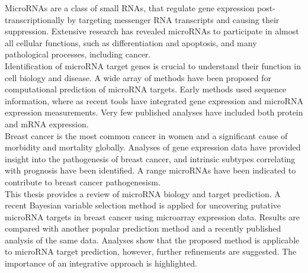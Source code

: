 \documentclass[english,12pt,a4paper,pdftex,elec,utf8]{aaltothesis}
\begin{document}
\begin{abstractpage}[english]

MicroRNAs are a class of small RNAs, that regulate gene expression
post-transcriptionally by targeting messenger RNA transcripts and causing their
suppression. Extensive research has revealed microRNAs to participate in
almost all cellular functions, such as differentiation and apoptosis, and
many pathological processes, including cancer. \\

Identification of microRNA target genes is crucial to understand their
function in cell biology and disease. A wide array of methods have been
proposed for computational prediction of microRNA targets. Early methods used
sequence information, where as recent tools have integrated gene expression
and microRNA expression measurements. Very few published analyses have
included both protein and mRNA expression. \\

Breast cancer is the most common cancer in women and a significant cause of
morbidity and mortality globally. Analyses of gene expression data have
provided insight into the pathogenesis of breast cancer, and intrinsic subtypes
correlating with prognosis have been identified. A range microRNAs have been
indicated to contribute to breast cancer pathogenesism. \\

This thesis provides a review of microRNA biology and target prediction. A
recent Bayesian variable selection method is applied for uncovering putative
microRNA targets in breast cancer using microarray expression data. Results
are compared with another popular prediction method and a recently published
analysis of the same data. Analyses show that the proposed method is
applicable to microRNA target prediction, however, further refinements are
suggested. The importance of an integrative approach is highlighted.

\end{abstractpage}

\newpage
\end{document}
